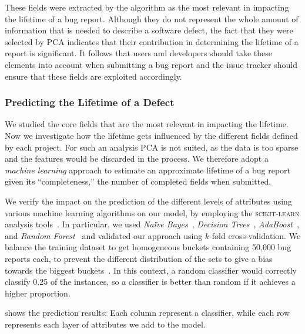 These fields were extracted by the algorithm as the most relevant in impacting the lifetime of a bug report.
Although they do not represent the whole amount of information that is needed to describe a software defect, the fact that they were selected by PCA indicates that their contribution in determining the lifetime of a report is significant.
It follows that users and developers should take these elements into account when submitting a bug report and the issue tracker should ensure that these fields are exploited accordingly.

\subsubsection{Predicting the Lifetime of a Defect} We studied the core fields that are the most relevant in impacting the lifetime.
Now we investigate how the lifetime gets influenced by the different fields defined by each project.
For such an analysis PCA is not suited, as the data is too sparse and the features would be discarded in the process.
We therefore adopt a \emph{machine learning} approach to estimate an approximate lifetime of a bug report given its ``completeness,'' \ie the number of completed fields when submitted.

We verify the impact on the prediction of the different levels of attributes using various machine learning algorithms on our model, by employing the \textsc{scikit-learn} analysis tools~\cite{Pedr2012}.
In particular, we used \emph{Na\"ive Bayes}~\cite{mitc1997}, \emph{Decision Trees}~\cite{mitc1997}, \emph{AdaBoost}~\cite{bish2006}, and \emph{Random Forest}~\cite{brei01} and validated our approach using $k$-fold cross-validation.
We balance the training dataset to get homogeneous buckets containing 50,000 bug reports each, to prevent the different distribution of the sets to give a bias towards the biggest buckets~\cite{bati2004}.
In this context, a random classifier would correctly classify 0.25 of the instances, so a classifier is better than random if it achieves a higher proportion.

 shows the prediction results: Each column represent a classifier, while each row represents each layer of attributes we add to the model.


